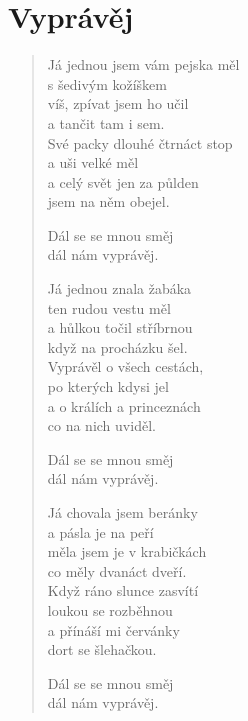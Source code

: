 \section*{Vyprávěj}

\begin{verse}
Já jednou jsem vám pejska měl \\
s šedivým kožíškem \\
víš, zpívat jsem ho učil \\
a tančit tam i sem.\\
Své packy dlouhé čtrnáct stop\\
a uši velké měl\\
a celý svět jen za půlden\\
jsem na něm obejel.

Dál se se mnou směj\\
dál nám vyprávěj.

Já jednou znala žabáka\\
ten rudou vestu měl\\
a hůlkou točil stříbrnou\\
když na procházku šel.\\
Vyprávěl o všech cestách,\\
po kterých kdysi jel\\
a o králích a princeznách\\
co na nich uviděl.

Dál se se mnou směj\\
dál nám vyprávěj.

Já chovala jsem beránky\\
a pásla je na peří\\
měla jsem je v krabičkách\\
co měly dvanáct dveří.\\
Když ráno slunce zasvítí\\
loukou se rozběhnou\\
a přínáší mi červánky\\
dort se šlehačkou.

Dál se se mnou směj\\
dál nám vyprávěj.




\end{verse}
